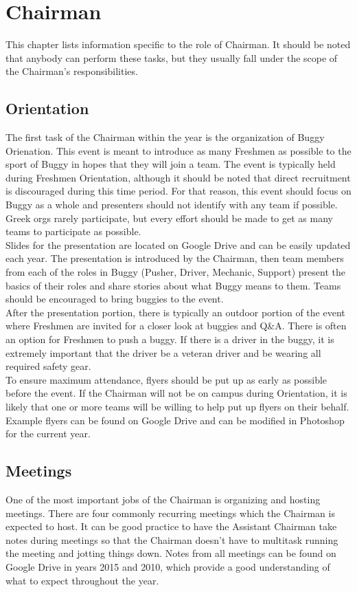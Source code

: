\chapter{Chairman}
\label{ch:Chairman}

This chapter lists information specific to the role of Chairman. It should be
noted that anybody can perform these tasks, but they usually fall under the
scope of the Chairman's responsibilities.

\section{Orientation}
The first task of the Chairman within the year is the organization of Buggy
Orienation. This event is meant to introduce as many Freshmen as possible
to the sport of Buggy in hopes that they will join a team. The event is
typically held during Freshmen Orientation, although it should be noted
that direct recruitment is discouraged during this time period. For that
reason, this event should focus on Buggy as a whole and presenters should
not identify with any team if possible. Greek orgs rarely participate, but
every effort should be made to get as many teams to participate as possible.
\\
Slides for the presentation are located on Google Drive and can be easily
updated each year. The presentation is introduced by the Chairman, then
team members from each of the roles in Buggy (Pusher, Driver, Mechanic,
Support) present the basics of their roles and share stories about what
Buggy means to them. Teams should be encouraged to bring buggies to the event.
\\
After the presentation portion, there is typically an outdoor portion of the
event where Freshmen are invited for a closer look at buggies and Q\&A. There
is often an option for Freshmen to push a buggy. If there is a driver in the
buggy, it is extremely important that the driver be a veteran driver and be
wearing all required safety gear.
\\
To ensure maximum attendance, flyers should be put up as early as possible
before the event. If the Chairman will not be on campus during Orientation,
it is likely that one or more teams will be willing to help put up flyers on
their behalf. Example flyers can be found on Google Drive and can be modified
in Photoshop for the current year.

\section{Meetings}
\label{sec:Meetings}
One of the most important jobs of the Chairman is organizing and hosting
meetings. There are four commonly recurring meetings which the Chairman
is expected to host. It can be good practice to have the Assistant Chairman
take notes during meetings so that the Chairman doesn't have to multitask
running the meeting and jotting things down. Notes from all meetings can
be found on Google Drive in years 2015 and 2010, which provide a good
understanding of what to expect throughout the year.

